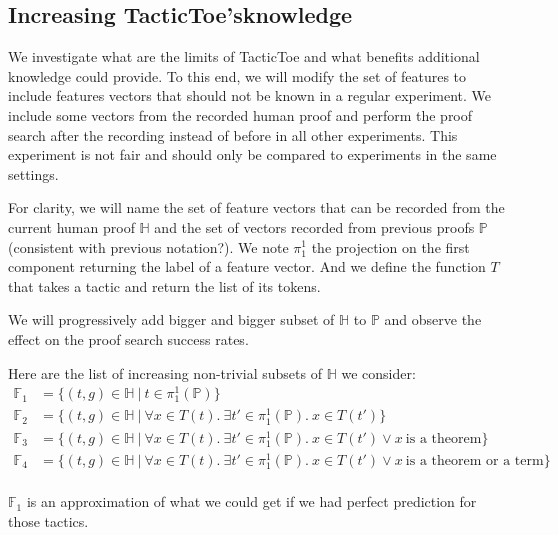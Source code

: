 \documentclass[runningheads,a4paper,draft]{svjour3}
\def\tactictoe{\textsf{TacticToe}\xspace}
\begin{document}
\subsection{Increasing \tactictoe'sknowledge}\label{sec:perfect_exp}


We investigate what are the limits of \tactictoe and what benefits additional 
knowledge could provide. To this end, we will modify the set of features to 
include features vectors that should not be known in a regular experiment. We  
include some vectors from the recorded human proof and perform the proof 
search 
after the recording instead of before in all other experiments. This 
experiment 
is not fair and should only be compared to 
experiments in the same settings.

For clarity, we will name the set of feature vectors that can be recorded from 
the current human proof $\mathbb{H}$ and the set of vectors recorded from 
previous proofs $\mathbb{P}$ (consistent with previous notation?). We note 
$\pi_1^1$ the projection on the 
first component returning the label of a feature vector. And we define the 
function $T$ that takes a tactic and return the list of its tokens.

We will progressively add bigger and bigger 
subset of $\mathbb{H}$ to $\mathbb{P}$ and observe the effect on the proof 
search success rates. 

Here are the list of increasing non-trivial subsets of $\mathbb{H}$ we 
consider:
\begin{align*}
\mathbb{F}_1 &= \lbrace (t,g) \in \mathbb{H}\ |\ t \in \pi_1^1(\mathbb{P})  
   \rbrace \\
\mathbb{F}_2 &= \lbrace (t,g) \in \mathbb{H}\ |\ \forall x \in T(t).\ \exists 
t'\in \pi_1^1(\mathbb{P}).\ x \in T(t') \rbrace\\
\mathbb{F}_3 &= \lbrace (t,g) \in \mathbb{H}\ |\ \forall x \in T(t).\ \exists 
t'\in \pi_1^1(\mathbb{P}).\ x \in T(t') \vee x\ \mbox{is a theorem} \rbrace\\
\mathbb{F}_4 &= \lbrace (t,g) \in \mathbb{H}\ |\ \forall x \in T(t).\ \exists 
t'\in \pi_1^1(\mathbb{P}).\ x \in T(t') \vee x\ \mbox{is a theorem or a term} 
\rbrace\\
\end{align*}


$\mathbb{F}_1$ is an approximation of what we could get if we had perfect 
prediction for those tactics.
\end{document}

